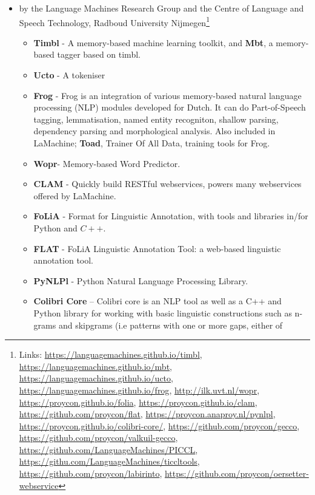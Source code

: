\documentclass[a4paper,11pt]{article}
\begin{document}
\begin{itemize}
 \item by the Language Machines Research Group and the Centre of Language and Speech Technology, Radboud University
     Nijmegen\footnote{Links: \url{https://languagemachines.github.io/timbl}, \url{https://languagemachines.github.io/mbt},
    \url{https://languagemachines.github.io/ucto}, \url{https://languagemachines.github.io/frog},
    \url{http://ilk.uvt.nl/wopr}, \url{https://proycon.github.io/folia}, \url{https://proycon.github.io/clam},
\url{https://github.com/proycon/flat}, \url{https://proycon.anaproy.nl/pynlpl},
\url{https://proycon.github.io/colibri-core/},
\url{https://github.com/proycon/gecco},
\url{https://github.com/proycon/valkuil-gecco},
\url{https://github.com/LanguageMachines/PICCL}, \url{https://githu.com/LanguageMachines/ticcltools},
\url{https://github.com/proycon/labirinto},
\url{https://github.com/proycon/oersetter-webservice}
}
 \begin{itemize}
     \item \textbf{Timbl} - A memory-based machine learning
         toolkit, and \textbf{Mbt}, a memory-based tagger based on timbl.
     \item \textbf{Ucto} - A tokeniser
     \item \textbf{Frog} - Frog is an integration of various memory-based natural language processing (NLP) modules
         developed for Dutch. It can do Part-of-Speech tagging, lemmatisation, named entity recogniton, shallow parsing,
         dependency parsing and morphological analysis. Also included in LaMachine;
         \textbf{Toad}, Trainer Of All Data, training tools for Frog.
     \item \textbf{Wopr}- Memory-based Word Predictor.
     \item \textbf{CLAM} - Quickly build RESTful webservices, powers many webservices offered by LaMachine.
     \item \textbf{FoLiA} - Format for Linguistic Annotation, with tools and libraries in/for Python and $C++$.
     \item \textbf{FLAT} - FoLiA Linguistic Annotation Tool: a web-based linguistic annotation tool.
     \item \textbf{PyNLPl} - Python Natural Language Processing Library.
     \item \textbf{Colibri Core} -- Colibri core is an NLP tool as well as a C++ and Python library for working with
         basic linguistic constructions such as n-grams and skipgrams (i.e patterns with one or more gaps, either of

\end{itemize}
\end{itemize}
\end{document}
